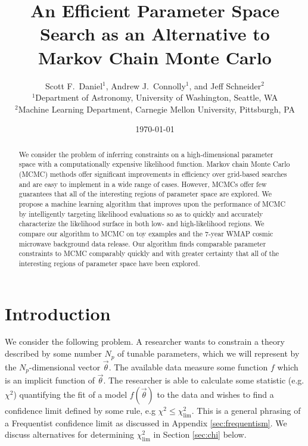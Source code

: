 \documentclass[useAMS,usenatbib]{aastex}
\title
{An Efficient Parameter Space Search as an Alternative to Markov Chain Monte Carlo}
\author
{Scott F.\ Daniel$^1$, Andrew J.\ Connolly$^1$, and Jeff Schneider$^2$\\
$^1$Department of Astronomy, University of Washington, Seattle, WA\\ 
$^2$Machine Learning Department, Carnegie Mellon University, Pittsburgh, PA
}
\begin{document}
 



\label{firstpage}

\date{\today}

\maketitle 

\begin{abstract} 
We consider the problem of inferring constraints on a high-dimensional parameter
space with a computationally expensive likelihood function.  
Markov chain Monte Carlo (MCMC) methods offer significant improvements in
efficiency over grid-based searches and are easy to implement in a wide range of
cases.  However, MCMCs offer 
few guarantees that all of the interesting regions of 
parameter space are explored.
We propose a
machine learning algorithm that improves upon the performance of MCMC
by intelligently targeting likelihood evaluations so as to quickly and
accurately characterize the likelihood surface in both low- and high-likelihood
regions.  
We compare our algorithm to MCMC on toy examples and the 7-year WMAP
cosmic microwave background data release.  
Our algorithm finds comparable parameter
constraints to MCMC comparably quickly and with greater
certainty that all of the interesting regions of parameter space have been
explored.
\end{abstract} 

\section{Introduction}
\label{sec:intro}

We consider the following problem.  A researcher wants to constrain a theory
described by some number $N_p$ of tunable parameters, which we will represent by
the $N_p$-dimensional vector $\vec{\theta}$.  The available data measure some
function $f$ which is an implicit function of $\vec{\theta}$.  The researcher
is able to calculate some statistic (e.g. $\chi^2$) quantifying the fit of a 
model $f(\vec{\theta})$ to the data and wishes to find a confidence limit
defined by some rule, e.g $\chi^2\le\chi^2_\text{lim}$.  This is a general
phrasing of a Frequentist confidence limit as discussed in Appendix
\ref{sec:frequentism}.  We discuss alternatives for determining
$\chi^2_\text{lim}$ in Section \ref{sec:chi} below.
\end{document}
